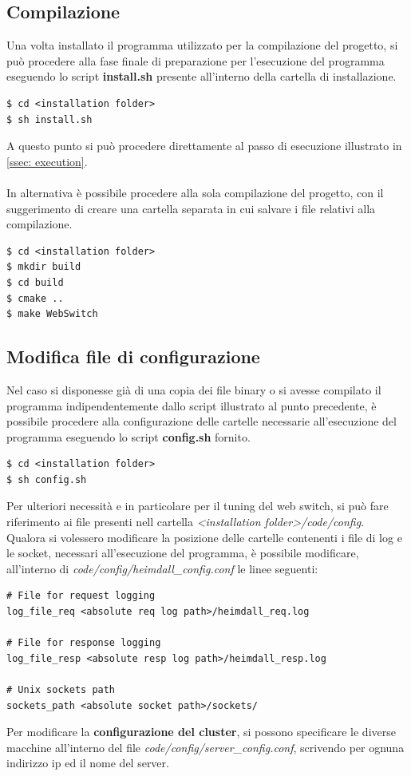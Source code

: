 \documentclass[italian]{tktltiki2}
\begin{document}
\subsection{Compilazione}
Una volta installato il programma utilizzato per la compilazione del progetto, si può procedere alla fase finale di preparazione per l'esecuzione del programma eseguendo lo script \textbf{install.sh} presente all'interno della cartella di installazione.
\begin{lstlisting}
$ cd <installation folder>
$ sh install.sh 
\end{lstlisting}
A questo punto si può procedere direttamente al passo di esecuzione illustrato in \ref{ssec: execution}.
\\
\\
In alternativa è possibile procedere alla sola compilazione del progetto, con il suggerimento di creare una cartella separata in cui salvare i file relativi alla compilazione.
\begin{lstlisting}
$ cd <installation folder>
$ mkdir build
$ cd build
$ cmake ..
$ make WebSwitch
\end{lstlisting}
\subsection{Modifica file di configurazione} \label{ssec: configuration}
Nel caso si disponesse già di una copia dei file binary o si avesse compilato il programma indipendentemente dallo script illustrato al punto precedente, è possibile procedere alla configurazione delle cartelle necessarie all'esecuzione del programma eseguendo lo script \textbf{config.sh} fornito.
\begin{lstlisting}
$ cd <installation folder>
$ sh config.sh 
\end{lstlisting}
Per ulteriori necessità e in particolare per il tuning del web switch, si può fare riferimento ai file presenti nell cartella \emph{<installation folder>/code/config}. 
\\
Qualora si volessero modificare la posizione delle cartelle contenenti i file di log e le socket, necessari all'esecuzione del programma, è possibile modificare, all'interno di \emph{code/config/heimdall\_config.conf} le linee seguenti:
\begin{lstlisting}
# File for request logging
log_file_req <absolute req log path>/heimdall_req.log

# File for response logging
log_file_resp <absolute resp log path>/heimdall_resp.log

# Unix sockets path
sockets_path <absolute socket path>/sockets/  
\end{lstlisting}
Per modificare la \textbf{configurazione del cluster}, si possono specificare le diverse macchine all'interno del file \emph{code/config/server\_config.conf}, scrivendo per ognuna indirizzo ip ed il nome del server.
\\
\end{document}
